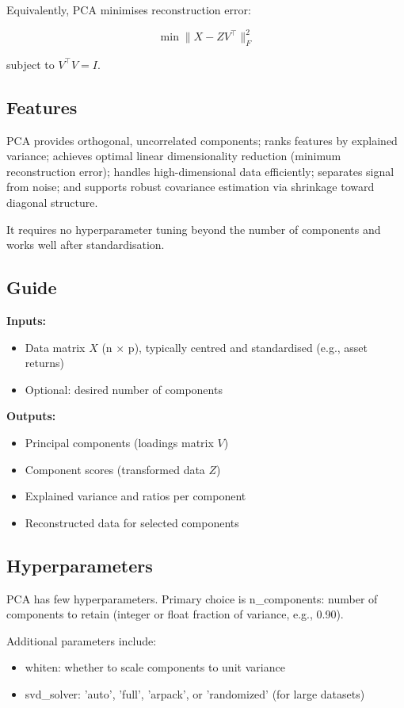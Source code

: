 \documentclass[11pt,a4paper]{article}
\begin{document}
Equivalently, PCA minimises reconstruction error:

\[
\min \| X - Z V^\top \|^2_F
\]

subject to \( V^\top V = I \).

\subsection{Features}
PCA provides orthogonal, uncorrelated components; ranks features by explained variance; achieves optimal linear dimensionality reduction (minimum reconstruction error); handles high-dimensional data efficiently; separates signal from noise; and supports robust covariance estimation via shrinkage toward diagonal structure.

It requires no hyperparameter tuning beyond the number of components and works well after standardisation.

\subsection{Guide}
\textbf{Inputs:}
\begin{itemize}
\item Data matrix \( X \) (n × p), typically centred and standardised (e.g., asset returns)
\item Optional: desired number of components
\end{itemize}

\textbf{Outputs:}
\begin{itemize}
\item Principal components (loadings matrix \( V \))
\item Component scores (transformed data \( Z \))
\item Explained variance and ratios per component
\item Reconstructed data for selected components
\end{itemize}

\subsection{Hyperparameters}
PCA has few hyperparameters. Primary choice is n\_components: number of components to retain (integer or float fraction of variance, e.g., 0.90).

Additional parameters include:
\begin{itemize}
\item whiten: whether to scale components to unit variance
\item svd\_solver: 'auto', 'full', 'arpack', or 'randomized' (for large datasets)
\end{itemize}
\end{document}
